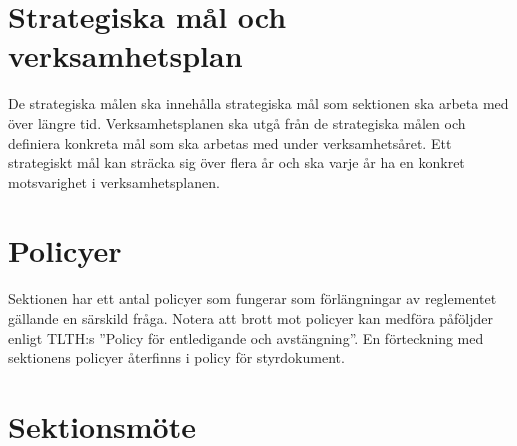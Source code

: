 \documentclass[pdfbookmarks,a4paper,11pt]{article}
\newlength{\itemcollength}
\newenvironment{reglemlista}{%
  \begin{list}{}{%
      \setlength{\labelwidth}{\itemcollength}%
      \setlength{\leftmargin}{\labelwidth + \labelsep}%
      \renewcommand{\makelabel}[1]{%
        \raisebox{0pt}[1ex][0pt]{%
          \makebox[\labelwidth][l]{%
            \parbox[t]{\itemcollength}{%
              \raggedright\hspace{0pt}##1}}}\hfill}%
      }}{%
  \end{list}}
\begin{document}
\section{Strategiska mål och verksamhetsplan}

\begin{reglemlista}

	\item[Strategiska mål och verksamhetsplan]
	De strategiska målen ska innehålla strategiska mål som sektionen ska arbeta med
över längre tid. Verksamhetsplanen ska utgå från de strategiska målen och definiera konkreta mål som ska arbetas med under verksamhetsåret. Ett strategiskt mål
kan sträcka sig över flera år och ska varje år ha en konkret motsvarighet i verksamhetsplanen.

\end{reglemlista}

\section{Policyer}

\begin{reglemlista}
	\item[Policyer]
    Sektionen har ett antal policyer som fungerar som förlängningar av reglementet gällande en särskild fråga. Notera att brott mot policyer kan medföra påföljder enligt TLTH:s ''Policy för entledigande och avstängning''. En förteckning med sektionens policyer återfinns i policy för styrdokument.
\end{reglemlista}


\section{Sektionsmöte}
\end{document}

